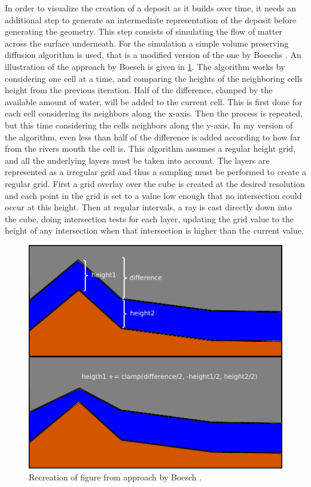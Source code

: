 \documentclass[a4paper,12pt]{report}
\begin{document}
In order to visualize the creation of a deposit as it builds over time, it needs an additional step to generate an intermediate representation of the deposit before generating the geometry. This step consists of simulating the flow of matter across the surface underneath. For the simulation a simple volume preserving diffusion algorithm is used, that is a modified version of the one by Boeschs \cite{Boesch:2011:Online}. An illustration of the approach by Boesch is given in \ref{fig:boesch}. The algorithm works by considering one cell at a time, and comparing the heights of the neighboring cells height from the previous iteration. Half of the difference, clamped by the available amount of water, will be added to the current cell. This is first done for each cell considering its neighbors along the x-axis. Then the process is repeated, but this time considering the cells neighbors along the y-axis.  In my version of the algorithm, even less than half of the difference is added according to how far from the rivers mouth the cell is.  This algorithm assumes a regular height grid, and all the underlying layers must be taken into account. The layers are represented as a irregular grid and thus a sampling must be performed to create a regular grid. First a grid overlay over the cube is created at the desired resolution and each point in the grid is set to a value low enough that no intersection could occur at this height. Then at regular intervals, a ray is cast directly down into the cube, doing intersection tests for each layer, updating the grid value to the height of any intersection when that intersection is higher than the 
current value.
\begin{figure}
 \includegraphics[width=\linewidth]{thesis/diffuse.pdf}
 \caption{Recreation of figure from approach by Boesch \cite{Boesch:2011:Online}.}
 \label{fig:boesch}
\end{figure}
\end{document}
